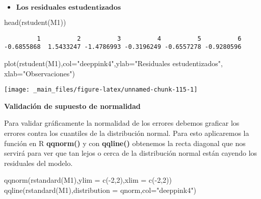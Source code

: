\documentclass[
  a4paper,
  oneside,
  openany]{book}
\newenvironment{Shaded}{\begin{snugshade}}{\end{snugshade}}
\newcommand{\AttributeTok}[1]{\textcolor[rgb]{0.77,0.63,0.00}{#1}}
\newcommand{\DecValTok}[1]{\textcolor[rgb]{0.00,0.00,0.81}{#1}}
\newcommand{\FunctionTok}[1]{\textcolor[rgb]{0.00,0.00,0.00}{#1}}
\newcommand{\NormalTok}[1]{#1}
\newcommand{\SpecialCharTok}[1]{\textcolor[rgb]{0.00,0.00,0.00}{#1}}
\newcommand{\StringTok}[1]{\textcolor[rgb]{0.31,0.60,0.02}{#1}}
\providecommand{\tightlist}{%
  \setlength{\itemsep}{0pt}\setlength{\parskip}{0pt}}
\begin{document}
\begin{itemize}
\tightlist
\item
  \(\textbf{Los residuales estudentizados}\)
\end{itemize}

\begin{Shaded}
\begin{Highlighting}[]
\FunctionTok{head}\NormalTok{(}\FunctionTok{rstudent}\NormalTok{(M1))}
\end{Highlighting}
\end{Shaded}

\begin{verbatim}
         1          2          3          4          5          6 
-0.6855868  1.5433247 -1.4786993 -0.3196249 -0.6557278 -0.9280596 
\end{verbatim}

\begin{Shaded}
\begin{Highlighting}[]
\FunctionTok{plot}\NormalTok{(}\FunctionTok{rstudent}\NormalTok{(M1),}\AttributeTok{col=}\StringTok{"deeppink4"}\NormalTok{,}\AttributeTok{ylab=}\StringTok{"Residuales estudentizados"}\NormalTok{, }\AttributeTok{xlab=}\StringTok{"Observaciones"}\NormalTok{)}
\end{Highlighting}
\end{Shaded}

\begin{center}\texttt{[image: \_main\_files/figure-latex/unnamed-chunk-115-1]} \end{center}

\textbf{Validación de supuesto de normalidad}

Para validar gráficamente la normalidad de los errores debemos graficar los errores contra los cuantiles de la distribución normal. Para esto aplicaremos la función en R \textbf{qqnorm()} y con \textbf{qqline()} obtenemos la recta diagonal que nos servirá para ver que tan lejos o cerca de la distribución normal están cayendo los residuales del modelo.

\begin{Shaded}
\begin{Highlighting}[]
\FunctionTok{qqnorm}\NormalTok{(}\FunctionTok{rstandard}\NormalTok{(M1),}\AttributeTok{ylim =} \FunctionTok{c}\NormalTok{(}\SpecialCharTok{{-}}\DecValTok{2}\NormalTok{,}\DecValTok{2}\NormalTok{),}\AttributeTok{xlim =} \FunctionTok{c}\NormalTok{(}\SpecialCharTok{{-}}\DecValTok{2}\NormalTok{,}\DecValTok{2}\NormalTok{))}
\FunctionTok{qqline}\NormalTok{(}\FunctionTok{rstandard}\NormalTok{(M1),}\AttributeTok{distribution =}\NormalTok{ qnorm,}\AttributeTok{col=}\StringTok{"deeppink4"}\NormalTok{)}
\end{Highlighting}
\end{Shaded}
\end{document}
